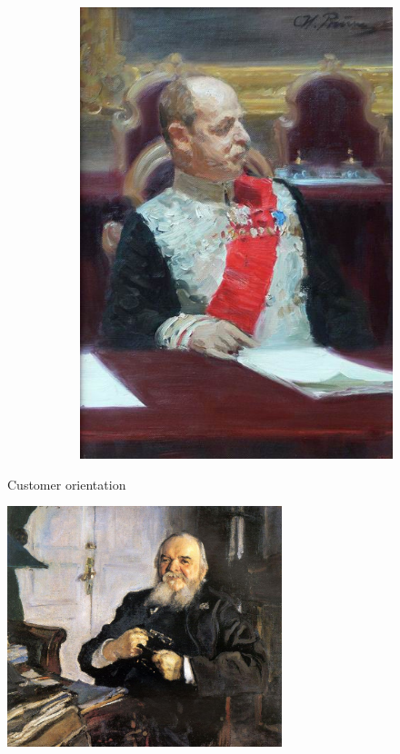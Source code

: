 \documentclass{beamer}
\begin{document}
\begin{frame}
\begin{figure}
\begin{subfigure}{.5\textwidth}
  \includegraphics[width=.8\linewidth]{P2023.AIBCCSS.Drawing/sketch2.jpg}
\end{subfigure}
\end{figure}

\end{frame}

\begin{frame}
{\centerline{Customer orientation}}

\begin{center}
\includegraphics[width=8cm]{P2023.AIBCCSS.Drawing/serov_turchaninov.jpg}
\end{center}

\end{frame}
\end{document}
